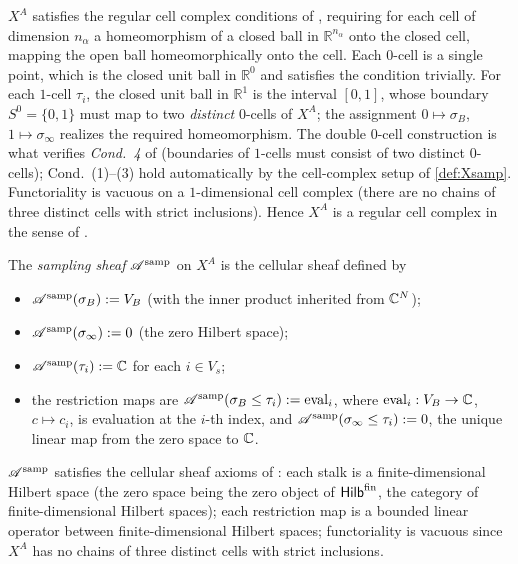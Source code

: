 \begin{remark}\label{rem:Xsamp-regularity}
$X^A$ satisfies the regular cell complex conditions of
\cite[\S 2, Def.~1]{HansenGhrist2019}, requiring for each cell of
dimension $n_\alpha$ a homeomorphism of a closed ball in
$\mathbb{R}^{n_\alpha}$ onto the closed cell, mapping the open ball
homeomorphically onto the cell. Each $0$-cell is a single point,
which is the closed unit ball in $\mathbb{R}^0$ and satisfies the
condition trivially. For each $1$-cell $\tau_i$, the closed unit
ball in $\mathbb{R}^1$ is the interval $[0,1]$, whose boundary
$S^0 = \{0, 1\}$ must map to two \emph{distinct} $0$-cells of $X^A$;
the assignment $0 \mapsto \sigma_B$, $1 \mapsto \sigma_\infty$
realizes the required homeomorphism. The double $0$-cell construction
is what verifies \emph{Cond.~4} of \cite[\S 2, Def.~1]{HansenGhrist2019}
(boundaries of $1$-cells must consist of two distinct $0$-cells);
Cond.~(1)--(3) hold automatically by the cell-complex setup of
\cref{def:Xsamp}. Functoriality is vacuous on a $1$-dimensional cell
complex (there are no chains of three distinct cells with strict
inclusions). Hence $X^A$ is a regular cell complex in the sense of
\cite[\S 2, Def.~1, Cond.~4]{HansenGhrist2019}.
\end{remark}

\begin{definition}\label{def:sampling-sheaf}
The \emph{sampling sheaf} $\mathscr{A}^{\mathrm{samp}}$ on $X^A$ is the cellular sheaf
defined by
\begin{itemize}[leftmargin=2em]
  \item $\mathscr{A}^{\mathrm{samp}}(\sigma_B) := V_B$ (with the inner product inherited
        from $\mathbb{C}^N$);
  \item $\mathscr{A}^{\mathrm{samp}}(\sigma_\infty) := 0$ (the zero Hilbert space);
  \item $\mathscr{A}^{\mathrm{samp}}(\tau_i) := \mathbb{C}$ for each $i \in V_s$;
  \item the restriction maps are
        $\mathscr{A}^{\mathrm{samp}}(\sigma_B \le \tau_i) := \operatorname{eval}_i$, where
        $\operatorname{eval}_i : V_B \to \mathbb{C}$, $c \mapsto c_i$, is evaluation at the
        $i$-th index, and
        $\mathscr{A}^{\mathrm{samp}}(\sigma_\infty \le \tau_i) := 0$, the unique linear
        map from the zero space to $\mathbb{C}$.
\end{itemize}
\end{definition}

\begin{remark}\label{rem:samps-cellular}
$\mathscr{A}^{\mathrm{samp}}$ satisfies the cellular sheaf axioms of
\cite[\S 2, Def.~4]{HansenGhrist2019}: each stalk is a
finite-dimensional Hilbert space (the zero space being the zero
object of $\mathsf{Hilb}^{\mathrm{fin}}$, the category of finite-dimensional
Hilbert spaces); each restriction map is a bounded linear operator
between finite-dimensional Hilbert spaces; functoriality is vacuous
since $X^A$ has no chains of three distinct cells with strict
inclusions.
\end{remark}

